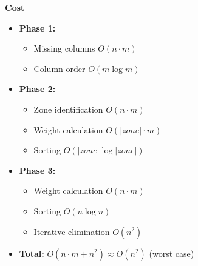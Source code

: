\documentclass[a4paper,12pt]{article}
\begin{document}
\textbf{Cost}
\begin{itemize}
    \item \textbf{Phase 1:} 
    \begin{itemize}
        \item Missing columns $O(n \cdot m)$ 
        \item Column order $O(m \log m)$
    \end{itemize}
    \item \textbf{Phase 2:}
    \begin{itemize}
        \item Zone identification $O(n \cdot m)$ 
        \item Weight calculation $O(|zone| \cdot m)$
        \item Sorting $O(|zone| \log |zone|)$
    \end{itemize}
    \item \textbf{Phase 3:}
    \begin{itemize}
        \item Weight calculation $O(n \cdot m)$ 
        \item Sorting $O(n \log n)$
        \item Iterative elimination $O(n^2)$
    \end{itemize}
    \item \textbf{Total:} $O(n \cdot m + n^2) \approx O(n^2)$ (worst case)
\end{itemize}

\end{document}
